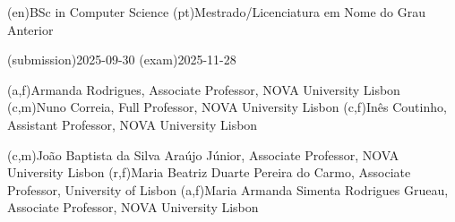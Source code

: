 \ntauthordegree(en){BSc in Computer Science}
\ntauthordegree(pt){Mestrado/Licenciatura em Nome do Grau Anterior}

\ntdate(submission){2025-09-30}
\ntdate(exam){2025-11-28}

(a,f){Armanda Rodrigues, Associate Professor, NOVA University Lisbon}
(c,m){Nuno Correia, Full Professor, NOVA University Lisbon}
(c,f){Inês Coutinho, Assistant Professor, NOVA University Lisbon}


(c,m){João Baptista da Silva Araújo Júnior, Associate Professor, NOVA University Lisbon}
(r,f){Maria Beatriz Duarte Pereira do Carmo, Associate Professor,  University of Lisbon}
(a,f){Maria Armanda Simenta Rodrigues Grueau, Associate Professor, NOVA University Lisbon}
